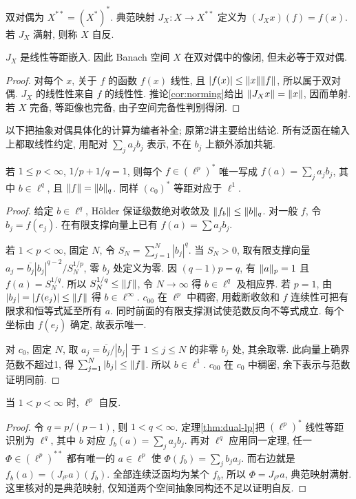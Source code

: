 \begin{definition}
双对偶为 $X^{**}=(X^*)^*$. 典范映射 $J_X:X\to X^{**}$ 定义为 $(J_Xx)(f)=f(x)$. 若 $J_X$ 满射, 则称 $X$ 自反.
\end{definition}

\begin{proposition}\label{prop:doubledual}
$J_X$ 是线性等距嵌入. 因此 Banach 空间 $X$ 在双对偶中的像闭, 但未必等于双对偶.
\end{proposition}
\begin{proof}
对每个 $x$, 关于 $f$ 的函数 $f(x)$ 线性, 且 $|f(x)|\le\lVert x\rVert\lVert f\rVert$, 所以属于双对偶. $J_X$ 的线性性来自 $f$ 的线性性. 推论\ref{cor:norming}给出 $\lVert J_Xx\rVert=\lVert x\rVert$, 因而单射. 若 $X$ 完备, 等距像也完备, 由子空间完备性判别得闭.
\end{proof}

以下把抽象对偶具体化的计算为编者补全; 原第2讲主要给出结论. 所有泛函在输入上都取线性约定, 用配对 $\sum_j a_jb_j$ 表示, 不在 $b_j$ 上额外添加共轭.

\begin{theorem}\label{thm:dual-lp}
若 $1\le p<\infty$, $1/p+1/q=1$, 则每个 $f\in(\ell^p)^*$ 唯一写成 $f(a)=\sum_ja_jb_j$, 其中 $b\in\ell^q$, 且 $\lVert f\rVert=\lVert b\rVert_q$. 同样 $(c_0)^*$ 等距对应于 $\ell^1$.
\end{theorem}
\begin{proof}
给定 $b\in\ell^q$, Hölder 保证级数绝对收敛及 $\lVert f_b\rVert\le\lVert b\rVert_q$. 对一般 $f$, 令 $b_j=f(e_j)$. 在有限支撑向量上已有 $f(a)=\sum a_jb_j$.

若 $1<p<\infty$, 固定 $N$, 令 $S_N=\sum_{j=1}^N|b_j|^q$. 当 $S_N>0$, 取有限支撑向量
$a_j=\overline{b_j}|b_j|^{q-2}/S_N^{1/p}$, 零 $b_j$ 处定义为零. 因 $(q-1)p=q$, 有 $\lVert a\rVert_p=1$ 且 $f(a)=S_N^{1/q}$. 所以 $S_N^{1/q}\le\lVert f\rVert$, 令 $N\to\infty$ 得 $b\in\ell^q$ 及相应界. 若 $p=1$, 由 $|b_j|=|f(e_j)|\le\lVert f\rVert$ 得 $b\in\ell^\infty$. $c_{00}$ 在 $\ell^p$ 中稠密, 用截断收敛和 $f$ 连续性可把有限求和恒等式延至所有 $a$. 同时前面的有限支撑测试使范数反向不等式成立. 每个坐标由 $f(e_j)$ 确定, 故表示唯一.

对 $c_0$, 固定 $N$, 取 $a_j=\overline{b_j}/|b_j|$ 于 $1\le j\le N$ 的非零 $b_j$ 处, 其余取零. 此向量上确界范数不超过1, 得 $\sum_{j=1}^N|b_j|\le\lVert f\rVert$. 所以 $b\in\ell^1$. $c_{00}$ 在 $c_0$ 中稠密, 余下表示与范数证明同前.
\end{proof}

\begin{corollary}\label{cor:lp-reflexive}
当 $1<p<\infty$ 时, $\ell^p$ 自反.
\end{corollary}
\begin{proof}
令 $q=p/(p-1)$, 则 $1<q<\infty$. 定理\ref{thm:dual-lp}把 $(\ell^p)^*$ 线性等距识别为 $\ell^q$, 其中 $b$ 对应 $f_b(a)=\sum_ja_jb_j$. 再对 $\ell^q$ 应用同一定理, 任一 $\Phi\in(\ell^p)^{**}$ 都有唯一的 $a\in\ell^p$ 使 $\Phi(f_b)=\sum_jb_ja_j$. 而右边就是 $f_b(a)=(J_{\ell^p}a)(f_b)$. 全部连续泛函均为某个 $f_b$, 所以 $\Phi=J_{\ell^p}a$, 典范映射满射. 这里核对的是典范映射, 仅知道两个空间抽象同构还不足以证明自反.
\end{proof}

